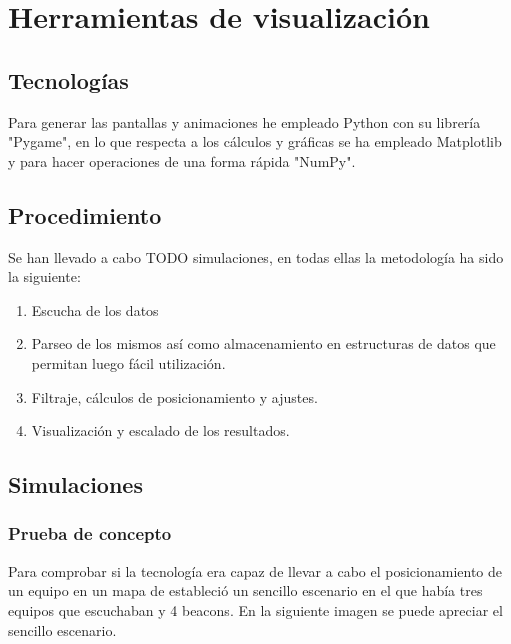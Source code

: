 \documentclass[a4paper ,12pt, onecolumn]{article}
\begin{document}
\section{Herramientas de visualización}
    \subsection{Tecnologías}
        Para generar las pantallas y animaciones he empleado Python con su librería "Pygame", en lo que respecta a los cálculos 
        y gráficas se ha empleado Matplotlib y para hacer operaciones de una forma rápida "NumPy".    
    \subsection{Procedimiento}
        Se han llevado a cabo TODO simulaciones, en todas ellas la metodología ha sido la siguiente:
        \begin{enumerate}
            \item Escucha de los datos
            \item Parseo de los mismos así como almacenamiento en estructuras de datos que permitan luego fácil utilización.
            \item Filtraje, cálculos de posicionamiento y ajustes.
            \item Visualización y escalado de los resultados.
        \end{enumerate}
    \subsection{Simulaciones}
        \subsubsection{Prueba de concepto}
            Para comprobar si la tecnología era capaz de llevar a cabo el posicionamiento de un equipo en un mapa de estableció un sencillo
            escenario en el que había tres equipos que escuchaban y 4 beacons. En la siguiente imagen se puede apreciar el sencillo escenario.
\end{document}

